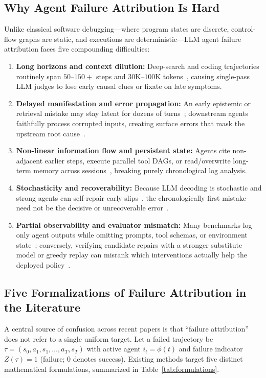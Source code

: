 \subsection{Why Agent Failure Attribution Is Hard}
Unlike classical software debugging---where program states are discrete, control-flow graphs are static, and executions are deterministic---LLM agent failure attribution faces five compounding difficulties:
\begin{enumerate}
  \item \textbf{Long horizons and context dilution:} Deep-search and coding trajectories routinely span $50$--$150+$ steps and $30\text{K}$--$100\text{K}$ tokens~\citep{liang2026searchauditor,wang2026drift,zhang2026longrca}, causing single-pass LLM judges to lose early causal clues or fixate on late symptoms.
  \item \textbf{Delayed manifestation and error propagation:} An early epistemic or retrieval mistake may stay latent for dozens of turns~\citep{zhao2026failureprocess}; downstream agents faithfully process corrupted inputs, creating surface errors that mask the upstream root cause~\citep{guo2026blade,liao2026emfa}.
  \item \textbf{Non-linear information flow and persistent state:} Agents cite non-adjacent earlier steps, execute parallel tool DAGs, or read/overwrite long-term memory across sessions~\citep{zhang2025graphtracer,deng2026memtrace,guan2026pararecover}, breaking purely chronological log analysis.
  \item \textbf{Stochasticity and recoverability:} Because LLM decoding is stochastic and strong agents can self-repair early slips~\citep{bi2026agentscope,luan2026symtrace}, the chronologically first mistake need not be the decisive or unrecoverable error~\citep{barke2026agentrx,shen2026epv}.
  \item \textbf{Partial observability and evaluator mismatch:} Many benchmarks log only agent outputs while omitting prompts, tool schemas, or environment state~\citep{chen2026traceelephant}; conversely, verifying candidate repairs with a stronger substitute model or greedy replay can misrank which interventions actually help the deployed policy~\citep{liao2026repairs}.
\end{enumerate}

\subsection{Five Formalizations of Failure Attribution in the Literature}
A central source of confusion across recent papers is that ``failure attribution'' does not refer to a single uniform target. Let a failed trajectory be $\tau = (s_0, a_1, s_1, \dots, a_T, s_T)$ with active agent $i_t = \phi(t)$ and failure indicator $Z(\tau)=1$ (failure; $0$ denotes success). Existing methods target five distinct mathematical formulations, summarized in Table~\ref{tab:formulations}.

